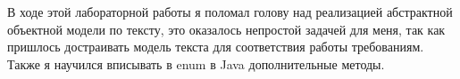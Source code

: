 В ходе этой лабораторной работы я поломал голову над реализацией абстрактной объектной модели по тексту, это оказалось непростой задачей для меня, так как пришлось достраивать модель текста для соответствия работы требованиям. Также я научился вписывать в enum в Java дополнительные методы.

